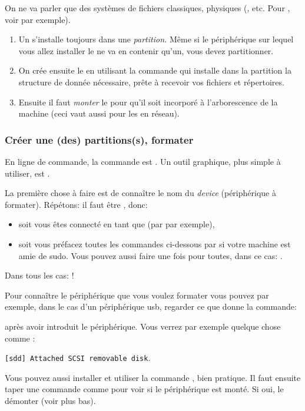 On ne va parler que des systèmes de fichiers classiques, physiques
(,  etc. Pour , voir par
exemple\cite{btrfs}).

\begin{enumerate}
\item Un \sff{} s'installe toujours dans une \emph{partition.} Même si
  le périphérique sur lequel vous allez installer le \sff{} ne va
  en contenir qu'un, vous devez partitionner.
\item On crée ensuite le \sff{} en utilisant la commande 
  qui installe dans la partition la structure de donnée nécessaire,
  prête à recevoir vos fichiers et répertoires.
\item Ensuite il faut \emph{monter} le \sff{} pour qu'il soit
  incorporé à l'arborescence de la machine (ceci vaut aussi pour les
  \sff{} en réseau).
\end{enumerate}
\subsubsection{Créer une (des) partitions(s), formater}
En ligne de commande, la commande est . Un outil graphique,
plus simple à utiliser, est .

La première chose à faire est de connaître le nom du \emph{device}
(périphérique à formater). Répétons: il faut être , donc:
\begin{itemize}
\item soit vous êtes connecté en tant que   (par 
  par exemple),
\item soit vous préfacez toutes les commandes ci-dessous par 
  si votre machine est amie de sudo. Vous pouvez aussi faire une fois
  pour toutes, dans ce cas: .
\end{itemize}
Dans tous les cas: \textdbend!

Pour connaître le périphérique que vous voulez formater vous pouvez
par exemple, dans le cas d'un périphérique usb, regarder ce que donne
la commande: 


après avoir introduit le périphérique. Vous verrez par exemple quelque
chose comme :

\begin{center}
\texttt{[sdd] Attached SCSI removable disk}.
\end{center}


Vous pouvez aussi installer et utiliser la commande , bien
pratique.
Il faut ensuite taper une commande comme  pour voir si le
périphérique est monté. Si oui, le démonter (voir plus bas).

